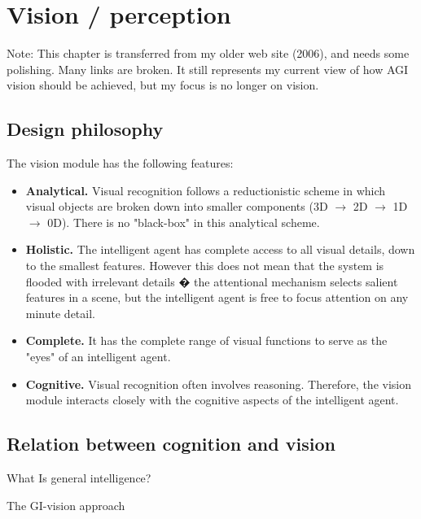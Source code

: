 \chapter{Vision / perception}
\label{ch:vision}
\minitoc

Note:  This chapter is transferred from my older web site (2006), and needs some polishing.  Many links are broken.  It still represents my current view of how AGI vision should be achieved, but my focus is no longer on vision.

\section{Design philosophy}

The vision module has the following features:
\begin{itemize}

\item \textbf{Analytical.} Visual recognition follows a reductionistic scheme in which visual objects are broken down into smaller components (3D $\rightarrow$ 2D $\rightarrow$ 1D $\rightarrow$ 0D). There is no "black-box" in this analytical scheme. 

\item \textbf{Holistic.} The intelligent agent has complete access to all visual details, down to the smallest features. However this does not mean that the system is flooded with irrelevant details � the attentional mechanism selects salient features in a scene, but the intelligent agent is free to focus attention on any minute detail. 

\item \textbf{Complete.} It has the complete range of visual functions to serve as the "eyes" of an intelligent agent. 

\item \textbf{Cognitive.} Visual recognition often involves reasoning. Therefore, the vision module interacts closely with the cognitive aspects of the intelligent agent. 
\end{itemize}

\section{Relation between cognition and  vision}

\begin{compactenum-}
	\item What Is general intelligence?
	\item The GI-vision approach
\end{compactenum-}

